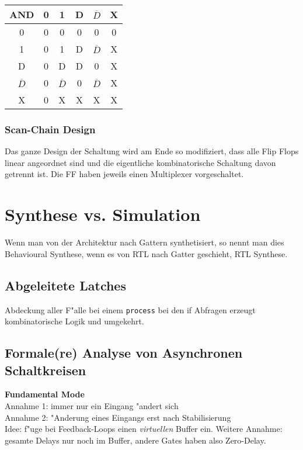 \documentclass[german, 10pt, a4paper, twocolumn]{scrartcl}
\theoremstyle{definition}
\begin{document}
\begin{tabular}{c|ccccc}
	AND &	0 &	1 &	D &	$\overline{D}$ &	X \\ \hline
	0 &	0 &	0 &	0 &	0 &			0 \\
	1 &	0 &	1 &	D &	$\overline{D}$ &	X \\
	D &	0 &	D &	D &	0 &			X \\
	$\overline{D}$ &	0 &	$\overline{D}$ &	0 &	$\overline{D}$ &	X \\
	X &	0 &	X &	X &	X &			X
\end{tabular}


\subsubsection{Scan-Chain Design}

Das ganze Design der Schaltung wird am Ende so modifiziert, dass alle Flip Flops linear angeordnet sind und die eigentliche kombinatorische Schaltung davon getrennt ist. Die FF haben jeweils einen Multiplexer vorgeschaltet.

\section{Synthese vs. Simulation}

Wenn man von der Architektur nach Gattern synthetisiert, so nennt man dies Behavioural Synthese, wenn es von RTL nach Gatter geschieht, RTL Synthese.

\subsection{Abgeleitete Latches}

Abdeckung aller F"alle bei einem \verb#process# bei den if Abfragen erzeugt kombinatorische Logik und umgekehrt.

\subsection{Formale(re) Analyse von Asynchronen Schaltkreisen}

\textbf{Fundamental Mode}\\
Annahme 1: immer nur ein Eingang "andert sich\\
Annahme 2: "Anderung eines Eingangs erst nach Stabilisierung\\

Idee: f"uge bei Feedback-Loops einen \textit{virtuellen} Buffer ein. Weitere Annahme: gesamte Delays nur noch im Buffer, andere Gates haben also Zero-Delay.
\end{document}
